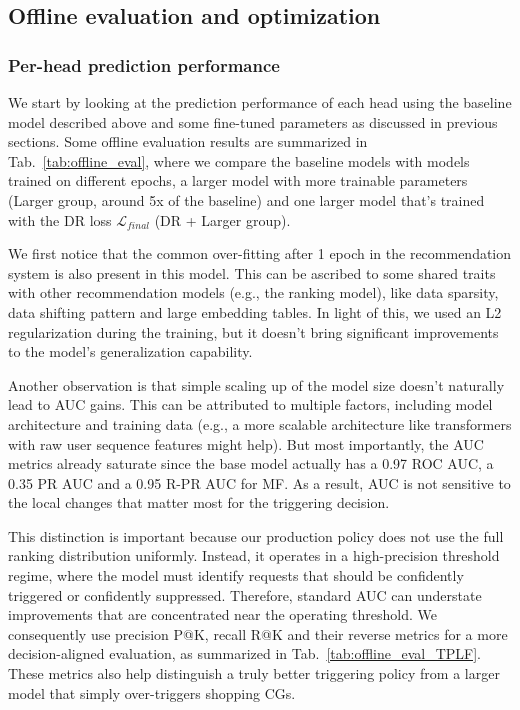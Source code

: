 \documentclass[sigconf, authorversion]{acmart}
\begin{document}
\subsection{Offline evaluation and optimization}
\subsubsection{Per-head prediction performance} We start by looking at the prediction performance of each head using the baseline model described above and some fine-tuned parameters as discussed in previous sections. Some offline evaluation results are summarized in Tab.~\ref{tab:offline_eval}, where we compare the baseline models with models trained on different epochs, a larger model with more trainable parameters (Larger group, around 5x of the baseline) and one larger model that's trained with the DR loss $\mathcal{L}_{final}$ (DR + Larger group).

We first notice that the common over-fitting after 1 epoch in the recommendation system is also present in this model. This can be ascribed to some shared traits with other recommendation models (e.g., the ranking model), like data sparsity, data shifting pattern and large embedding tables. In light of this, we used an L2 regularization during the training, but it doesn't bring significant improvements to the model's generalization capability.

Another observation is that simple scaling up of the model size doesn't naturally lead to AUC gains. This can be attributed to multiple factors, including model architecture and training data (e.g., a more scalable architecture like transformers with raw user sequence features might help). But most importantly, the AUC metrics already saturate since the base model actually has a 0.97 ROC AUC, a 0.35 PR AUC and a 0.95 R-PR AUC for MF. As a result, AUC is not sensitive to the local changes that matter most for the triggering decision.

This distinction is important because our production policy does not use the full ranking distribution uniformly. Instead, it operates in a high-precision threshold regime, where the model must identify requests that should be confidently triggered or confidently suppressed. Therefore, standard AUC can understate improvements that are concentrated near the operating threshold. We consequently use precision P@K, recall R@K and their reverse metrics for a more decision-aligned evaluation, as summarized in Tab.~\ref{tab:offline_eval_TPLF}. These metrics also help distinguish a truly better triggering policy from a larger model that simply over-triggers shopping CGs.
\end{document}

